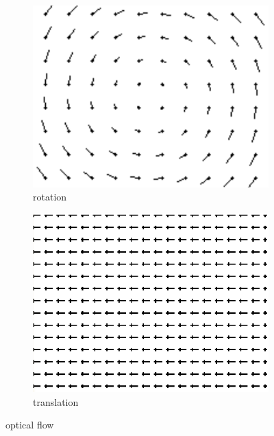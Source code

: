 \documentclass[11pt]{article}
\begin{document}
	\begin{figure}[H]
	        \centering
	        \begin{subfigure}[b]{0.45\textwidth}
	                \includegraphics[width=1.0\textwidth]{images/rotation.png}
	                \caption{rotation}
	        \end{subfigure}\hfill 
	        \begin{subfigure}[b]{0.45\textwidth}
	                \includegraphics[width=1.0\textwidth]{images/translation.png}
	                \caption{translation}
	        \end{subfigure}
	\caption{optical flow \cite{BewegungsanalyseMuenchen}}

	\end{figure}
\end{document}
